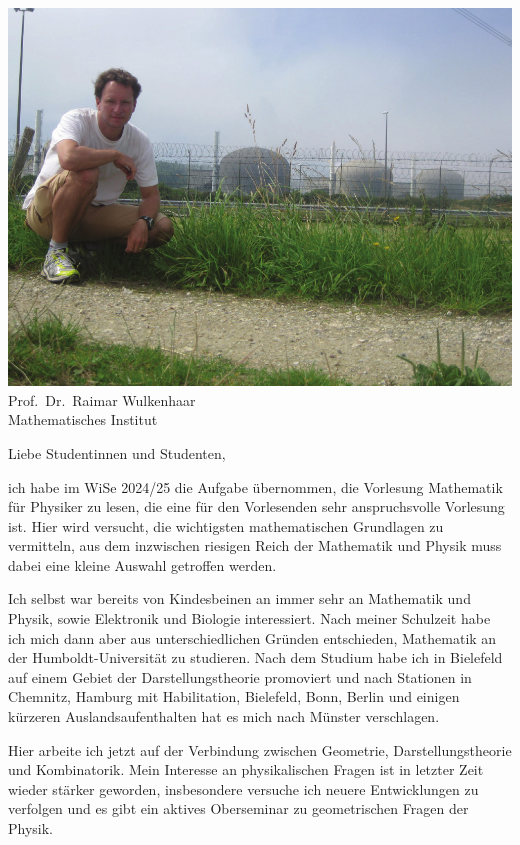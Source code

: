 \begin{multicols}{2}
\begin{center}
	\includegraphics[width=\columnwidth, height=0.35\textheight]{res/vorstellungsfotos/wulkenhaar.png}\\
	\smallskip
 	Prof.\ Dr.\ Raimar Wulkenhaar\\
	Mathematisches Institut
\end{center}
Liebe Studentinnen und Studenten,

ich habe im WiSe 2024/25 die Aufgabe übernommen, die Vorlesung Mathematik für Physiker zu lesen, die eine für den Vorlesenden sehr anspruchsvolle Vorlesung ist. Hier wird versucht, die wichtigsten mathematischen Grundlagen zu vermitteln, aus dem inzwischen riesigen Reich der Mathematik und Physik muss dabei eine kleine Auswahl getroffen werden.

Ich selbst war bereits von Kindesbeinen an immer sehr an Mathematik und Physik, sowie Elektronik und Biologie interessiert. Nach meiner Schulzeit habe ich mich dann aber aus unterschiedlichen Gründen entschieden, Mathematik an der Humboldt-Universität zu studieren. Nach dem Studium habe ich in Bielefeld auf einem Gebiet der Darstellungstheorie promoviert und nach Stationen in Chemnitz, Hamburg mit Habilitation, Bielefeld, Bonn, Berlin und einigen kürzeren Auslandsaufenthalten hat es mich nach Münster verschlagen.

Hier arbeite ich jetzt auf der Verbindung zwischen Geometrie, Darstellungstheorie und Kombinatorik. Mein Interesse an physikalischen Fragen ist in letzter Zeit wieder stärker geworden, insbesondere versuche ich neuere Entwicklungen zu verfolgen und es gibt ein aktives Oberseminar zu geometrischen Fragen der Physik.


\end{multicols}
